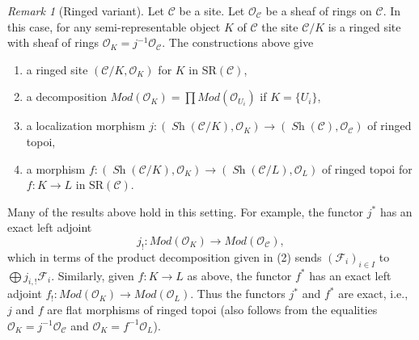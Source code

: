 \documentclass[10pt,a4paper]{amsart}
\theoremstyle{plain}
\theoremstyle{definition}
\theoremstyle{remark}
\newtheorem{remark}[subsection]{Remark}
\numberwithin{equation}{subsection}
\def\Sh{\mathop{\mathit{Sh}}\nolimits}
\begin{document}
\begin{remark}[Ringed variant]
\label{remark-semi-representable-ringed}
Let $\mathcal{C}$ be a site. Let $\mathcal{O}_\mathcal{C}$
be a sheaf of rings on $\mathcal{C}$. In this case, for any
semi-representable object $K$ of $\mathcal{C}$ the site
$\mathcal{C}/K$ is a ringed site with sheaf
of rings $\mathcal{O}_K = j^{-1}\mathcal{O}_\mathcal{C}$.
The constructions above give
\begin{enumerate}
\item a ringed site $(\mathcal{C}/K, \mathcal{O}_K)$
for $K$ in $\text{SR}(\mathcal{C})$,
\item a decomposition
$\textit{Mod}(\mathcal{O}_K) =
\prod \textit{Mod}(\mathcal{O}_{U_i})$ if $K = \{U_i\}$,
\item a localization morphism
$j : (\Sh(\mathcal{C}/K), \mathcal{O}_K) \to
(\Sh(\mathcal{C}), \mathcal{O}_\mathcal{C})$
of ringed topoi,
\item a morphism
$f : (\Sh(\mathcal{C}/K), \mathcal{O}_K) \to
(\Sh(\mathcal{C}/L), \mathcal{O}_L)$ of ringed topoi
for $f : K \to L$ in $\text{SR}(\mathcal{C})$.
\end{enumerate}
Many of the results above hold in this setting. For example, the
functor $j^*$ has an exact left adjoint
$$
j_! : \textit{Mod}(\mathcal{O}_K) \to \textit{Mod}(\mathcal{O}_\mathcal{C}),
$$
which in terms of the product decomposition given in (2) sends
$(\mathcal{F}_i)_{i \in I}$ to $\bigoplus j_{i, !}\mathcal{F}_i$.
Similarly, given $f : K \to L$ as above, the functor $f^*$ has
an exact left adjoint
$f_! : \textit{Mod}(\mathcal{O}_K) \to \textit{Mod}(\mathcal{O}_L)$.
Thus the functors $j^*$ and $f^*$ are exact, i.e.,
$j$ and $f$ are flat morphisms of ringed topoi (also follows
from the equalities $\mathcal{O}_K = j^{-1}\mathcal{O}_\mathcal{C}$
and $\mathcal{O}_K = f^{-1}\mathcal{O}_L$).
\end{remark}
\end{document}
